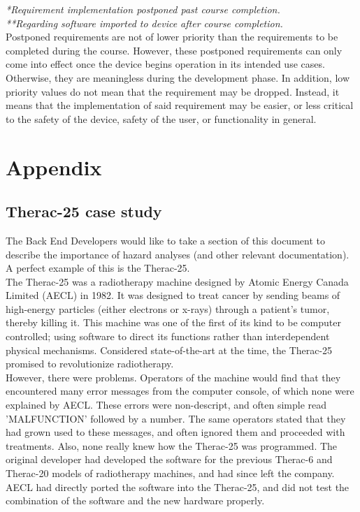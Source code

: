 \documentclass{article}
\begin{document}
\textit{*Requirement implementation postponed past course completion.}\\
\textit{**Regarding software imported to device after course completion.}\\

Postponed requirements are not of lower priority than the requirements to be completed during the course. However, these postponed requirements can only come into effect once the device begins operation in its intended use cases. Otherwise, they are meaningless during the development phase. In addition, low priority values do not mean that the requirement may be dropped. Instead, it means that the implementation of said requirement may be easier, or less critical to the safety of the device, safety of the user, or functionality in general.\\

\pagebreak

\section*{Appendix}
\subsection*{Therac-25 case study}
The Back End Developers would like to take a section of this document to describe the importance of hazard analyses (and other relevant documentation). A perfect example of this is the Therac-25.\\

The Therac-25 was a radiotherapy machine designed by Atomic Energy Canada Limited (AECL) in 1982. It was designed to treat cancer by sending beams of high-energy particles (either electrons or x-rays) through a patient's tumor, thereby killing it. This machine was one of the first of its kind to be computer controlled; using software to direct its functions rather than interdependent physical mechanisms. \cite{leveson-1999} Considered state-of-the-art at the time, the Therac-25 promised to revolutionize radiotherapy.\\

However, there were problems. Operators of the machine would find that they encountered many error messages from the computer console, of which none were explained by AECL. These errors were non-descript, and often simple read 'MALFUNCTION' followed by a number. The same operators stated that they had grown used to these messages, and often ignored them and proceeded with treatments. Also, none really knew how the Therac-25 was programmed. The original developer had developed the software for the previous Therac-6 and Therac-20 models of radiotherapy machines, and had since left the company. AECL had directly ported the software into the Therac-25, and did not test the combination of the software and the new hardware properly.\\
\end{document}
